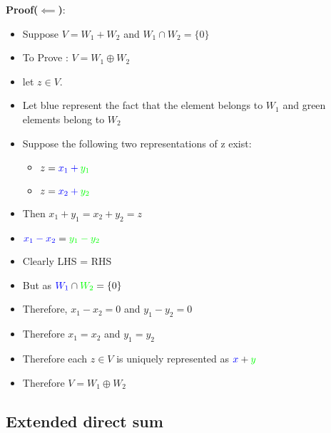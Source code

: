 \documentclass[twoside]{article}
\begin{document}
	{\bf Proof($\impliedby$)}:
	\begin{itemize}
		\item Suppose $V = W_1 + W_2$ and $W_1 \cap W_2 = \{0\}$ 
		\item To Prove : $V = W_1 \oplus W_2$
		\item let $z \in V$. 
		\item Let blue represent the fact that the element belongs to $W_1$ and green elements belong to $W_2$
		\item Suppose the following two representations of z exist:
		\begin{itemize}
			\item $z = {\color{blue}x_1 + \color{green}y_1}$ 
			\item $z = {\color{blue}x_2 + \color{green}y_2}$
		\end{itemize}
		\item Then $x_1 + y_1 = x_2 + y_2 = z$
		\item ${\color{blue}x_1 - x_2} = {\color{green}y_1 - y_2}$
		\item Clearly LHS = RHS
		\item But as ${\color{blue}W_1} \cap {\color{green}W_2} = \{0\}$
		\item Therefore, $x_1 - x_2 = 0$ and $y_1 - y_2 = 0$
		\item Therefore $x_1 = x_2$ and $y_1 = y_2$
		\item Therefore each $z \in V$ is uniquely represented as ${\color{blue}x} + {\color{green}y}$
		\item Therefore $V = W_1 \oplus W_2$
	\end{itemize}
	\subsection{Extended direct sum}
\end{document}
